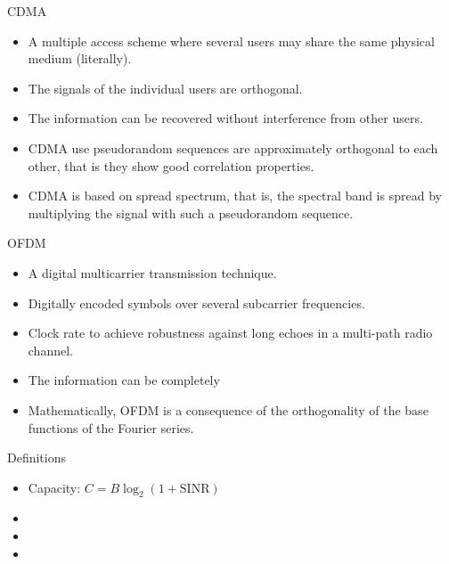 \documentclass{beamer}
\begin{document}
\begin{frame}{CDMA}
\begin{itemize}
    \item A multiple access scheme where several users may share the same
physical medium (literally).
    \item The signals of the individual users are orthogonal.
    \item The information can be recovered without interference from other users.
    \item CDMA use pseudorandom sequences are approximately orthogonal to each other, that is they show good correlation properties.
    \item CDMA is based on spread spectrum,
that is, the spectral band is spread by multiplying the signal with such a pseudorandom
sequence.
\end{itemize}
\end{frame}
\begin{frame}{OFDM}
\begin{itemize}
    \item A digital multicarrier transmission technique.
    \item Digitally encoded symbols over several subcarrier frequencies.
    \item Clock rate to achieve robustness against long echoes in a multi-path radio channel.
    \item The information can be completely
    \item Mathematically, OFDM is a consequence of the orthogonality of the base functions of the Fourier series.
\end{itemize}
\end{frame}





\begin{frame}{Definitions}
\begin{itemize}
    \item Capacity: $C=B\log_{2}\left(1+\text{SINR}\right)$
    \item 
    \item 
    \item 
\end{itemize}
\end{frame}
\end{document}
